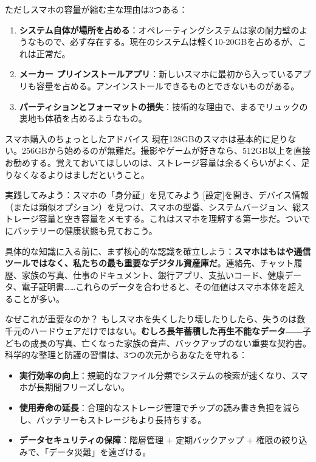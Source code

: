 ただしスマホの容量が縮む主な理由は3つある：

\begin{enumerate}
  \item \textbf{システム自体が場所を占める}：オペレーティングシステムは家の耐力壁のようなもので、必ず存在する。現在のシステムは軽く10-20GBを占めるが、これは正常だ。
  \item \textbf{メーカー プリインストールアプリ}：新しいスマホに最初から入っているアプリも容量を占める。アンインストールできるものとできないものがある。
  \item \textbf{パーティションとフォーマットの損失}：技術的な理由で、まるでリュックの裏地も体積を占めるようなもの。
\end{enumerate}

\begin{tcbinfo}{スマホ購入のちょっとしたアドバイス}
現在128GBのスマホは基本的に足りない。256GBから始めるのが無難だ。撮影やゲームが好きなら、512GB以上を直接お勧めする。覚えておいてほしいのは、ストレージ容量は余るくらいがよく、足りなくなるよりはましだということ。

\end{tcbinfo}

\begin{tcbpractice}{実践してみよう：スマホの「身分証」を見てみよう}
[設定]を開き、デバイス情報（または類似オプション）を見つけ、スマホの型番、システムバージョン、総ストレージ容量と空き容量をメモする。これはスマホを理解する第一歩だ。ついでにバッテリーの健康状態も見ておこう。

\end{tcbpractice}


具体的な知識に入る前に、まず核心的な認識を確立しよう：\textbf{スマホはもはや通信ツールではなく、私たちの最も重要なデジタル資産庫だ}。連絡先、チャット履歴、家族の写真、仕事のドキュメント、銀行アプリ、支払いコード、健康データ、電子証明書……これらのデータを合わせると、その価値はスマホ本体を超えることが多い。

\begin{tcbinfo}{なぜこれが重要なのか？}
もしスマホを失くしたり壊したりしたら、失うのは数千元のハードウェアだけではない。\textbf{むしろ長年蓄積した再生不能なデータ}――子どもの成長の写真、亡くなった家族の音声、バックアップのない重要な契約書。科学的な整理と防護の習慣は、3つの次元からあなたを守れる：

\begin{itemize}
  \item \textbf{実行効率の向上}：規範的なファイル分類でシステムの検索が速くなり、スマホが長期間フリーズしない。
  \item \textbf{使用寿命の延長}：合理的なストレージ管理でチップの読み書き負担を減らし、バッテリーもストレージもより長持ちする。
  \item \textbf{データセキュリティの保障}：階層管理 + 定期バックアップ + 権限の絞り込みで、「データ災難」を遠ざける。
\end{itemize}

\end{tcbinfo}

